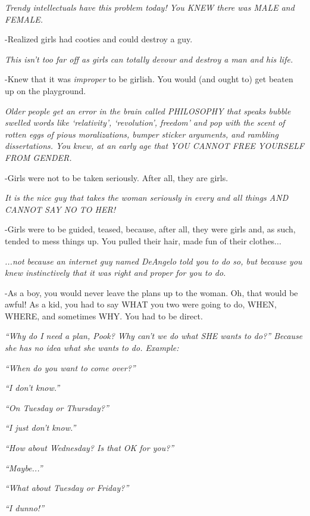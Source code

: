 			\textit{Trendy intellectuals have this problem today! You KNEW there was MALE and FEMALE.}

			-Realized girls had cooties and could destroy a guy.

			\textit{This isn't too far off as girls can totally devour and destroy a man and his life.}

			-Knew that it was \textit{improper} to be girlish. You would (and ought to) get beaten up on the playground.

			\textit{Older people get an error in the brain called PHILOSOPHY that speaks bubble swelled words like `relativity', `revolution', freedom' and pop with the scent of rotten eggs of pious moralizations, bumper sticker arguments, and rambling dissertations. You knew, at an early age that YOU CANNOT FREE YOURSELF FROM GENDER.}

			-Girls were not to be taken seriously. After all, they are girls.

			\textit{It is the nice guy that takes the woman seriously in every and all things AND CANNOT SAY NO TO HER!}

			-Girls were to be guided, teased, because, after all, they were girls and, as such, tended to mess things up. You pulled their hair, made fun of their clothes...

			\textit{...not because an internet guy named DeAngelo told you to do so, but because you knew instinctively that it was right and proper for you to do.}

			-As a boy, you would never leave the plans up to the woman. Oh, that would be awful! As a kid, you had to say WHAT you two were going to do, WHEN, WHERE, and sometimes WHY. You had to be direct.
			
			\textit{``Why do I need a plan, Pook? Why can't we do what SHE wants to do?'' Because she has no idea what she wants to do. Example:}
			
			\textit{``When do you want to come over?''}
			
			\textit{``I don't know.''}
			
			\textit{``On Tuesday or Thursday?''}
			
			\textit{``I just don't know.''}
			
			\textit{``How about Wednesday? Is that OK for you?''}
			
			\textit{``Maybe...''}
			
			\textit{``What about Tuesday or Friday?''}
			
			\textit{``I dunno!''}
			
